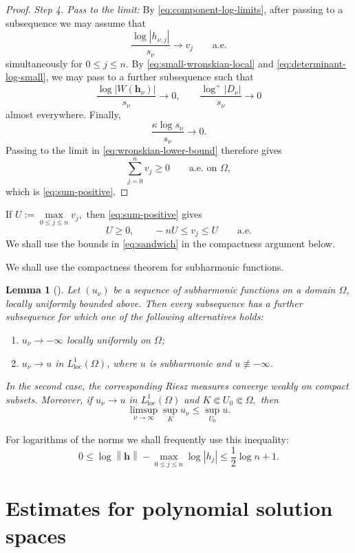 \documentclass[12pt,letterpaper,reqno]{amsart}
\newtheorem{lem}[thm]{Lemma}
\theoremstyle{definition}
\numberwithin{equation}{section}
\newcommand{\loc}{\mathrm{loc}}
\newcommand{\norm}[1]{\left\lVert#1\right\rVert}
\newcommand{\hv}{\bm h}
\begin{document}
\begin{proof}
\medskip\noindent
\emph{{Step 4. Pass to the limit:}}
By \eqref{eq:component-log-limits}, after passing to a subsequence we
may assume that
\[
 \frac{\log|h_{\nu,j}|}{s_\nu}
 \longrightarrow v_j
 \qquad\text{a.e.}
\]
simultaneously for \(0\leq j\leq n\). By
\eqref{eq:small-wronskian-local} and
\eqref{eq:determinant-log-small}, we may pass to a further subsequence
such that
\[
 \frac{\log|W(\hv_\nu)|}{s_\nu}\longrightarrow0,
 \qquad
 \frac{\log^+|D_\nu|}{s_\nu}\longrightarrow0
\]
almost everywhere. Finally,
\[
\frac{\kappa\log s_\nu}{s_\nu}\longrightarrow0.
\]
Passing to the limit in \eqref{eq:wronskian-lower-bound} therefore gives
\[
 \sum_{j=0}^{n}v_j\geq0
 \qquad\text{a.e.\ on }\Omega,
\]
which is \eqref{eq:sum-positive}.
\end{proof}

If
$
U:=\max\limits_{0\leq j\le n}v_j,
$
then \eqref{eq:sum-positive} gives
\begin{equation}\label{eq:sandwich}
 U\ge0,\qquad
 -nU\leq v_j\leq U
 \qquad\text{a.e.}
\end{equation}
We shall use the bounds in \eqref{eq:sandwich} in the compactness
argument below.

We shall use the compactness theorem for subharmonic functions.

\begin{lem}[{\cite[Theorem~4.1.9(a),(b)]{Hor03}}]\label{lem:subharmonic-compactness}
Let \((u_\nu)\) be a sequence of subharmonic functions on a domain
\(\Omega\), locally uniformly bounded above. Then every subsequence has a
further subsequence for which one of the following alternatives holds:
\begin{enumerate}[label=\textup{(\roman*)}]
\item \(u_\nu\to-\infty\) locally uniformly on \(\Omega\);
\item \(u_\nu\to u\) in \(L^1_{\loc}(\Omega)\), where \(u\) is subharmonic
and \(u\not\equiv-\infty\).
\end{enumerate}
In the second case, the corresponding Riesz measures converge weakly on
compact subsets. Moreover, if \(u_\nu\to u\) in \(L^1_{\loc}(\Omega)\) and
$
 K\Subset U_0\Subset\Omega,
$
then
\[
\limsup_{\nu\to\infty}\sup_Ku_\nu
 \leq\sup_{U_0}u.
\]
\end{lem}

For logarithms of the norms we shall frequently use this inequality:
\[
0\leq
 \log\norm{\hv}
 -\max_{0\leq j\le n}\log|h_j|
 \leq\frac12\log {n+1}.
\]

\section{Estimates for polynomial solution spaces}\label{sec:algebra}
\end{document}
